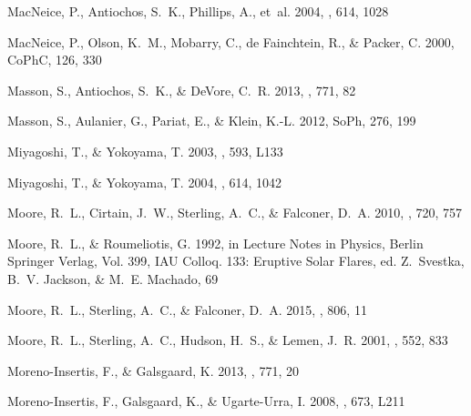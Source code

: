 \documentclass[twocolumn]{aastex6}
\newcommand{\cophc}{CoPhC}
\newcommand{\soph}{SoPh}
\begin{document}
\begin{thebibliography}{}
{MacNeice}, P., {Antiochos}, S.~K., {Phillips}, A., {et~al.} 2004, \apj, 614,
  1028

{MacNeice}, P., {Olson}, K.~M., {Mobarry}, C., {de Fainchtein}, R., \&
  {Packer}, C. 2000, \cophc, 126, 330

{Masson}, S., {Antiochos}, S.~K., \& {DeVore}, C.~R. 2013, \apj, 771, 82

{Masson}, S., {Aulanier}, G., {Pariat}, E., \& {Klein}, K.-L. 2012, \soph, 276,
  199

{Miyagoshi}, T., \& {Yokoyama}, T. 2003, \apjl, 593, L133

{Miyagoshi}, T., \& {Yokoyama}, T. 2004, \apj, 614, 1042

{Moore}, R.~L., {Cirtain}, J.~W., {Sterling}, A.~C., \& {Falconer}, D.~A. 2010,
  \apj, 720, 757

{Moore}, R.~L., \& {Roumeliotis}, G. 1992, in Lecture Notes in Physics, Berlin
  Springer Verlag, Vol. 399, IAU Colloq. 133: Eruptive Solar Flares, ed.
  Z.~{Svestka}, B.~V. {Jackson}, \& M.~E. {Machado}, 69

{Moore}, R.~L., {Sterling}, A.~C., \& {Falconer}, D.~A. 2015, \apj, 806, 11

{Moore}, R.~L., {Sterling}, A.~C., {Hudson}, H.~S., \& {Lemen}, J.~R. 2001,
  \apj, 552, 833

{Moreno-Insertis}, F., \& {Galsgaard}, K. 2013, \apj, 771, 20

{Moreno-Insertis}, F., {Galsgaard}, K., \& {Ugarte-Urra}, I. 2008, \apjl, 673,
  L211


\end{thebibliography}
\end{document}
